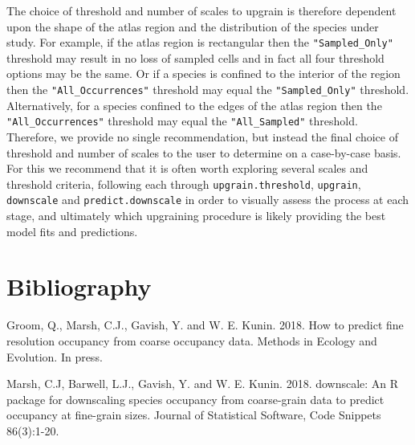 \documentclass{article}[12pt, a4paper]
\begin{document}
The choice of threshold and number of scales to upgrain is therefore dependent upon the shape of the atlas region and the distribution of the species under study. For example, if the atlas region is rectangular then the \texttt{"Sampled\_Only"} threshold may result in no loss of sampled cells and in fact all four threshold options may be the same. Or if a species is confined to the interior of the region then the \texttt{"All\_Occurrences"} threshold may equal the \texttt{"Sampled\_Only"} threshold. Alternatively, for a species confined to the edges of the atlas region then the \texttt{"All\_Occurrences"} threshold may equal the \texttt{"All\_Sampled"} threshold. Therefore, we provide no single recommendation, but instead the final choice of threshold and number of scales to the user to determine on a case-by-case basis. For this we recommend that it is often worth exploring several scales and threshold criteria, following each through \texttt{upgrain.threshold}, \texttt{upgrain}, \texttt{downscale} and \texttt{predict.downscale} in order to visually assess the process at each stage, and ultimately which upgraining procedure is likely providing the best model fits and predictions.

\section{Bibliography}

Groom, Q., Marsh, C.J., Gavish, Y. and W. E. Kunin. 2018. How to predict fine resolution occupancy from coarse occupancy data. Methods in Ecology and Evolution. In press.

Marsh, C.J, Barwell, L.J., Gavish, Y. and W. E. Kunin. 2018. downscale: An R package for downscaling species occupancy from coarse-grain data to predict occupancy at fine-grain sizes. Journal of Statistical Software, Code Snippets 86(3):1-20.
\end{document}
